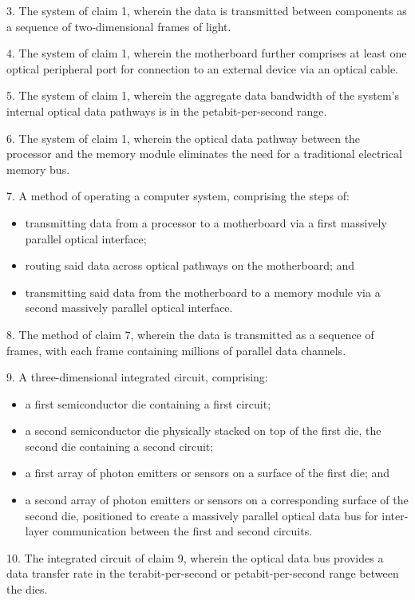 \documentclass[11pt,letterpaper]{article}
\begin{document}
3. The system of claim 1, wherein the data is transmitted between components as a sequence of two-dimensional frames of light.

4. The system of claim 1, wherein the motherboard further comprises at least one optical peripheral port for connection to an external device via an optical cable.

5. The system of claim 1, wherein the aggregate data bandwidth of the system’s internal optical data pathways is in the petabit-per-second range.

6. The system of claim 1, wherein the optical data pathway between the processor and the memory module eliminates the need for a traditional electrical memory bus.

7. A method of operating a computer system, comprising the steps of:
\begin{itemize}[leftmargin=2.5em]
    \item[] transmitting data from a processor to a motherboard via a first massively parallel optical interface;
    \item[] routing said data across optical pathways on the motherboard; and
    \item[] transmitting said data from the motherboard to a memory module via a second massively parallel optical interface.
\end{itemize}

8. The method of claim 7, wherein the data is transmitted as a sequence of frames, with each frame containing millions of parallel data channels.

9. A three-dimensional integrated circuit, comprising:
\begin{itemize}[leftmargin=2.5em]
    \item[] a first semiconductor die containing a first circuit;
    \item[] a second semiconductor die physically stacked on top of the first die, the second die containing a second circuit;
    \item[] a first array of photon emitters or sensors on a surface of the first die; and
    \item[] a second array of photon emitters or sensors on a corresponding surface of the second die, positioned to create a massively parallel optical data bus for inter-layer communication between the first and second circuits.
\end{itemize}

10. The integrated circuit of claim 9, wherein the optical data bus provides a data transfer rate in the terabit-per-second or petabit-per-second range between the dies.
\end{document}
